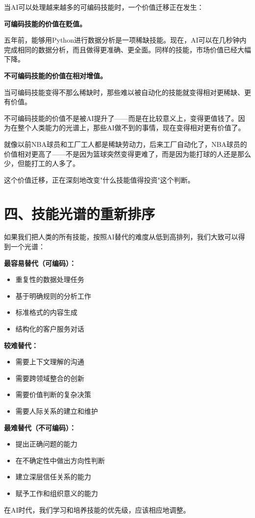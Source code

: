 当AI可以处理越来越多的可编码技能时，一个价值迁移正在发生：

\textbf{可编码技能的价值在贬值。}

五年前，能够用Python进行数据分析是一项稀缺技能。现在，AI可以在几秒钟内完成相同的数据分析，而且做得更准确、更全面。同样的技能，市场价值已经大幅下降。

\textbf{不可编码技能的价值在相对增值。}

当可编码技能变得不那么稀缺时，那些难以被自动化的技能就变得相对更稀缺、更有价值。

不可编码技能的价值不是被AI提升了——而是在比较意义上，变得更值钱了。因为在整个人类能力的光谱上，那些AI做不到的事情，现在变得相对更有价值了。

就像以前NBA球员和工厂工人都是稀缺劳动力，后来工厂自动化了，NBA球员的价值相对更高了——不是因为篮球突然变得更难了，而是因为能打球的人还是那么少，但能打工的人多了。

这个价值迁移，正在深刻地改变"什么技能值得投资"这个判断。

\section{四、技能光谱的重新排序}


如果我们把人类的所有技能，按照AI替代的难度从低到高排列，我们大致可以得到一个光谱：

\textbf{最容易替代（可编码）：}

\begin{itemize}
\item 重复性的数据处理任务
\item 基于明确规则的分析工作
\item 标准格式的内容生成
\item 结构化的客户服务对话

\end{itemize}
\textbf{较难替代：}

\begin{itemize}
\item 需要上下文理解的沟通
\item 需要跨领域整合的创新
\item 需要价值判断的复杂决策
\item 需要人际关系的建立和维护

\end{itemize}
\textbf{最难替代（不可编码）：}

\begin{itemize}
\item 提出正确问题的能力
\item 在不确定性中做出方向性判断
\item 建立深层信任关系的能力
\item 赋予工作和组织意义的能力

\end{itemize}
在AI时代，我们学习和培养技能的优先级，应该相应地调整。


